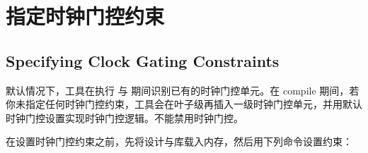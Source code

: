 \section{指定时钟门控约束}
\subsection*{Specifying Clock Gating Constraints}

默认情况下，工具在执行  与  期间识别已有的时钟门控单元。在 compile 期间，若你未指定任何时钟门控约束，工具会在叶子级再插入一级时钟门控单元，并用默认时钟门控设置实现时钟门控逻辑。不能禁用时钟门控。

在设置时钟门控约束之前，先将设计与库载入内存，然后用下列命令设置约束：

